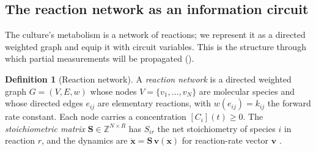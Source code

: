 \documentclass[11pt,twocolumn,a4paper]{article}
\theoremstyle{thmstyle}
\theoremstyle{definition}
\newtheorem{definition}[theorem]{Definition}
\theoremstyle{remark}
\newcommand{\Z}{\mathbb{Z}}
\newcommand{\V}{V}
\newcommand{\E}{E}
\begin{document}
\subsection{The reaction network as an information circuit}

The culture's metabolism is a network of reactions; we represent it as a
directed weighted graph and equip it with circuit variables. This is the
structure through which partial measurements will be propagated
().

\begin{definition}[Reaction network]
\label{def:network}
A \emph{reaction network} is a directed weighted graph $G=(\V,\E,w)$ whose
nodes $\V=\{v_1,\dots,v_N\}$ are molecular species and whose directed edges
$e_{ij}$ are elementary reactions, with $w(e_{ij})=k_{ij}$ the forward rate
constant. Each node carries a concentration $[C_i](t)\ge0$. The
\emph{stoichiometric matrix} $\mathbf{S}\in\Z^{N\times R}$ has $S_{ir}$ the
net stoichiometry of species $i$ in reaction $r$, and the dynamics are
$\dot{\mathbf{x}}=\mathbf{S}\,\mathbf{v}(\mathbf{x})$ for reaction-rate
vector $\mathbf{v}$
\citep{heinrich1996regulation,klipp2016systems}.
\end{definition}
\end{document}
